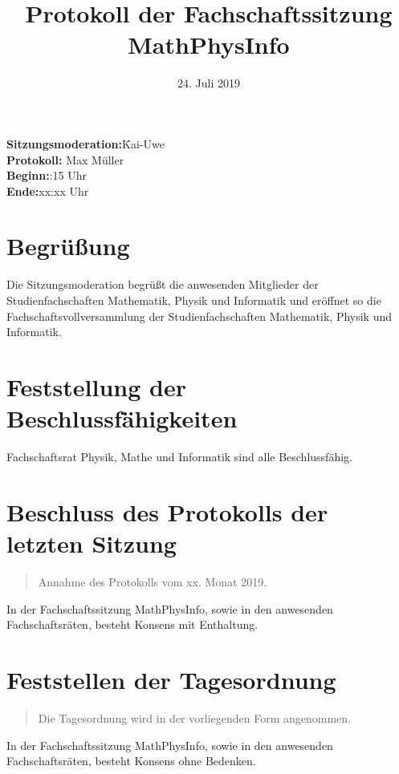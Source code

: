 \documentclass[11pt, fachschaft=mathphys,twosided=true]{mathphys/mathphys-article}
\newenvironment{antrag}{\begin{quote}\begin{itshape}}{\end{itshape}\end{quote}}
\newcommand{\konsens}[1]{In der Fachschaftssitzung MathPhysInfo, sowie in den anwesenden Fachschaftsräten, besteht Konsens ohne Bedenken.\\} %
\newcommand{\konsensE}[1]{In der Fachschaftssitzung MathPhysInfo, sowie in den anwesenden Fachschaftsräten, besteht Konsens mit Enthaltung.\\} %
\begin{document}
\date{\vspace{-2em} 24. Juli 2019 \vspace{-1em}} %
\title{\vspace{-2em}Protokoll der Fachschaftssitzung MathPhysInfo}
\maketitle

\begin{tabbing}
    \textbf{Sitzungsmoderation:}\quad\=Kai-Uwe \\%
    \textbf{Protokoll:}\> Max Müller \\%
    \textbf{Beginn:}:15 Uhr\\
    \textbf{Ende:}\>xx:xx Uhr\\ %
\end{tabbing}

\section{Begrüßung}
    Die Sitzungsmoderation begrüßt die anwesenden Mitglieder der Studienfachschaften Mathematik, Physik und Informatik und eröffnet so die Fachschaftsvollversammlung der Studienfachschaften Mathematik, Physik und Informatik.

\section{Feststellung der Beschlussfähigkeiten}
    Fachschaftsrat Physik, Mathe und Informatik sind alle Beschlussfähig.

\section{Beschluss des Protokolls der letzten Sitzung}

\begin{antrag}
	Annahme des Protokolls vom xx. Monat 2019. \\%
\end{antrag}
\konsensE{}

\section{Feststellen der Tagesordnung}
\begin{antrag}
    Die Tagesordnung wird in der vorliegenden Form angenommen.
\end{antrag}
\konsens{}
\end{document}
